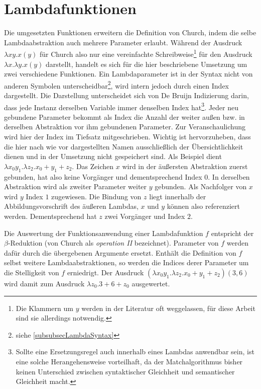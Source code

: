 \section{Lambdafunktionen} \label{subsecLambdafunktionen}
Die umgesetzten Funktionen erweitern die Definition von Church, indem die selbe Lambdaabstraktion auch mehrere Parameter erlaubt. Während der Ausdruck $\lambda x y . x(y)$ für Church also nur eine vereinfachte Schreibweise\footnote{Die Klammern um $y$ werden in der Literatur oft weggelassen, für diese Arbeit sind sie allerdings notwendig.} für den Ausdruck $\lambda x .\lambda y .x(y)$ darstellt, handelt es sich für die hier beschriebene Umsetzung um zwei verschiedene Funktionen. 
Ein Lambdaparameter ist in der Syntax nicht von anderen Symbolen unterscheidbar\footnote{siehe \ref{subsubsecLambdaSyntax}}, wird intern jedoch durch einen Index dargestellt. Die Darstellung unterscheidet sich von De Bruijn Indizierung \cite{deBruijn} darin, dass jede Instanz derselben Variable immer denselben Index hat\footnote{Sollte eine Ersetzungsregel auch innerhalb eines Lambdas anwendbar sein, ist eine solche Herangehensweise vorteilhaft, da der Matchalgorithmus bisher keinen Unterschied zwischen syntaktischer Gleichheit und semantischer Gleichheit macht.}.
 Jeder neu gebundene Parameter bekommt als Index die Anzahl der weiter außen bzw. in derselben Abstraktion vor ihm gebundenen Parameter. Zur Veranschaulichung wird hier der Index im Tiefsatz mitgeschrieben. Wichtig ist hervorzuheben, dass die hier nach wie vor dargestellten Namen ausschließlich der Übersichtlichkeit dienen und in der Umsetzung nicht gespeichert sind.
 Als Beispiel dient $\lambda x_0 y_1 .\lambda z_2 .x_0 + y_1 + z_2$. Das Zeichen $x$ wird in der äußersten Abstraktion zuerst gebunden, hat also keine Vorgänger und dementsprechend Index $0$. In derselben Abstraktion wird als zweiter Parameter weiter $y$ gebunden. Als Nachfolger von $x$ wird $y$ Index $1$ zugewiesen. Die Bindung von $z$ liegt innerhalb der Abbildungsvorschrift des äußeren Lambdas, $x$ und $y$ können also referenziert werden. Dementsprechend hat $z$ zwei Vorgänger und Index $2$. 
 
 Die Auswertung der Funktionsanwendung einer Lambdafunktion $f$ entspricht der $\beta$-Reduktion (von Church \cite{ChurchLambda36} als \textit{operation II} bezeichnet). Parameter von $f$ werden dafür durch die übergebenen Argumente ersetzt. Enthält die Definition von $f$ selbst weitere Lambdaabstraktionen, so werden die Indices derer Parameter um die Stelligkeit von $f$ erniedrigt.
 Der Ausdruck $(\lambda x_0 y_1 .\lambda z_2 .x_0 + y_1 + z_2)(3, 6)$ wird damit zum Ausdruck $\lambda z_0 .3 + 6 + z_0$ ausgewertet.
 
